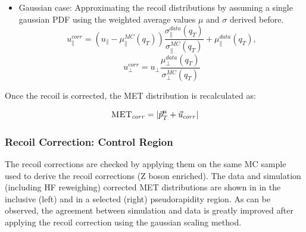 \begin{itemize}
\begin{itemize}
       \item Gaussian case: Approximating the recoil distributions by assuming a single gaussian PDF using the weighted average values $\mu$ and $\sigma$ derived before.
       \begin{equation}\label{eq:eqreccornsclupar} 
         u^{corr}_{\parallel} = (u_{\parallel} - \mu_{\parallel}^{MC}(q_{T}))\frac{\sigma_{\parallel}^{data}(q_{T})}{\sigma_{\parallel}^{MC}(q_{T})} + \mu_{\parallel}^{data}(q_{T}),
       \end{equation}
       \begin{equation}\label{eq:eqreccornscluperp} 
         u^{corr}_{\perp} = u_{\perp}\frac{\mu_{\perp}^{data}(q_{T})}{\sigma_{\perp}^{MC}(q_{T})}
       \end{equation}
      \end{itemize}

  \end{itemize}

Once the recoil is corrected, the MET distribution is recalculated as:

\begin{equation}
 \textsc{MET}_{corr} = \left|\vec{p}^{\mu}_{T} + \vec{u}_{corr}\right|
\end{equation}


\subsubsection{Recoil Correction: Control Region}\label{sec:WBoson_Corrections_MET_closureTests}

The recoil corrections are checked by applying them on the same MC sample used to derive the recoil corrections (Z boson enriched). The data and simulation (including HF reweighing) corrected MET distributions are shown in  in the inclusive (left) and in a selected (right) pseudorapidity region. As can be observed, the  agreement between simulation and data is greatly improved after applying the recoil correction using the gaussian scaling method.

